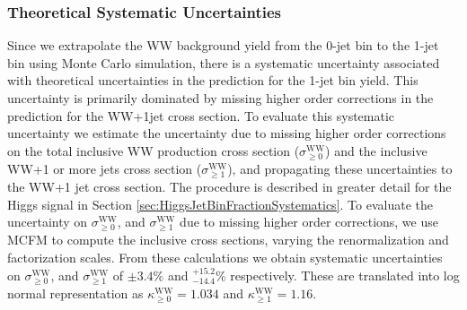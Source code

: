 %

\subsubsection{Theoretical Systematic Uncertainties} 
Since we extrapolate the WW background yield from the 0-jet bin to the 1-jet bin using Monte Carlo
simulation, there is a systematic uncertainty associated with theoretical uncertainties in
the prediction for the 1-jet bin yield. This uncertainty is primarily dominated by missing higher
order corrections in the prediction for the WW+1jet cross section. To evaluate this systematic 
uncertainty we estimate the uncertainty due to missing higher order corrections on the
total inclusive WW production cross section ($\sigma^{\mathrm{WW}}_{\geq 0}$) and the inclusive 
WW+1 or more jets cross section ($\sigma^{\mathrm{WW}}_{\geq 1}$), and propagating these uncertainties 
to the WW+1 jet cross section. The procedure is described in greater detail for the Higgs signal
in Section \ref{sec:HiggsJetBinFractionSystematics}. To evaluate the uncertainty on 
$\sigma^{\mathrm{WW}}_{\geq 0}$, and $\sigma^{\mathrm{WW}}_{\geq 1}$ due to missing higher 
order corrections, we use MCFM \cite{MCFMVVProduction} to compute the inclusive cross sections, 
varying the renormalization and factorization scales. From these calculations we obtain 
systematic uncertainties on $\sigma^{\mathrm{WW}}_{\geq 0}$, and 
$\sigma^{\mathrm{WW}}_{\geq 1}$ of $\pm 3.4\%$ and $^{+15.2}_{-14.4} \%$ respectively. These are translated into
log normal representation as $\kappa^{\mathrm{WW}}_{\geq 0} = 1.034$ and $\kappa^{\mathrm{WW}}_{\geq 1} = 1.16$.

